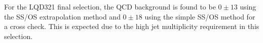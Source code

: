 For the LQD321 final selection, the QCD background is found to be $0 \pm 13$ using the SS/OS extrapolation method and $0 \pm 18$ using the simple SS/OS method for a cross check.
This is expected due to the high jet multiplicity requirement in this selection.











